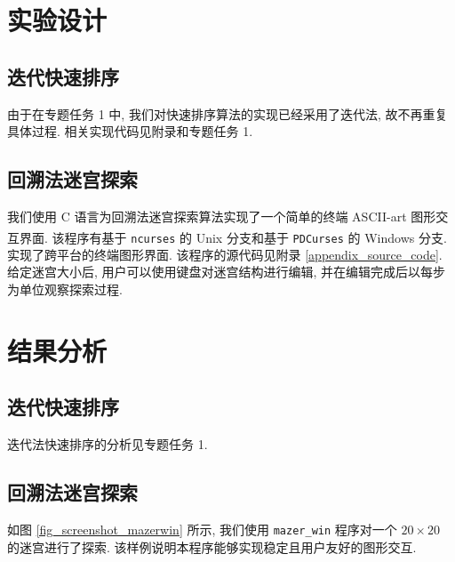 \documentclass[12pt]{article}
\begin{document}
\section{实验设计}

\subsection{迭代快速排序}

由于在专题任务 1 中, 我们对快速排序算法的实现已经采用了迭代法, 故不再重复具体过程. 相关实现代码见附录和专题任务 1.

\subsection{回溯法迷宫探索}

我们使用 C 语言为回溯法迷宫探索算法实现了一个简单的终端 ASCII-art 图形交互界面. 该程序有基于 \texttt{ncurses} \cite{bib_ncurses} 的 Unix\textsuperscript{\textregistered} 分支和基于 \texttt{PDCurses} \cite{bib_pdcurses} 的 Windows\textsuperscript{\textregistered} 分支. 实现了跨平台的终端图形界面. 该程序的源代码见附录 \ref{appendix_source_code}. 给定迷宫大小后, 用户可以使用键盘对迷宫结构进行编辑, 并在编辑完成后以每步为单位观察探索过程.

\section{结果分析}

\subsection{迭代快速排序}

迭代法快速排序的分析见专题任务 1.

\subsection{回溯法迷宫探索}

如图 \ref{fig_screenshot_mazerwin} 所示, 我们使用 \texttt{mazer\_win} 程序对一个 $20 \times 20$ 的迷宫进行了探索. 该样例说明本程序能够实现稳定且用户友好的图形交互.
\end{document}
